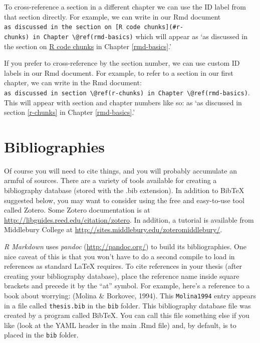 \documentclass[print]{nuthesis}
\begin{document}
To cross-reference a section in a different chapter we can use the ID label from that section directly. For example, we can write in our Rmd document \texttt{as\ discussed\ in\ the\ section\ on\ {[}R\ code\ chunks{]}(\#r-chunks)\ in\ Chapter\ \textbackslash{}@ref(rmd-basics)} which will appear as `as discussed in the section on \protect\hyperlink{r-chunks}{R code chunks} in Chapter \ref{rmd-basics}.'

If you prefer to cross-reference by the section number, we can use custom ID labels in our Rmd document. For example, to refer to a section in our first chapter, we can write in the Rmd document: \texttt{as\ discussed\ in\ section\ \textbackslash{}@ref(r-chunks)\ in\ Chapter\ \textbackslash{}@ref(rmd-basics)}. This will appear with section and chapter numbers like so: as `as discussed in section \ref{r-chunks} in Chapter \ref{rmd-basics}.'

\hypertarget{bibliographies}{%
\section{Bibliographies}\label{bibliographies}}

Of course you will need to cite things, and you will probably accumulate an armful of sources. There are a variety of tools available for creating a bibliography database (stored with the .bib extension). In addition to BibTeX suggested below, you may want to consider using the free and easy-to-use tool called Zotero. Some Zotero documentation is at \url{http://libguides.reed.edu/citation/zotero}. In addition, a tutorial is available from Middlebury College at \url{http://sites.middlebury.edu/zoteromiddlebury/}.

\emph{R Markdown} uses \emph{pandoc} (\url{http://pandoc.org/}) to build its bibliographies. One nice caveat of this is that you won't have to do a second compile to load in references as standard LaTeX requires. To cite references in your thesis (after creating your bibliography database), place the reference name inside square brackets and precede it by the ``at'' symbol. For example, here's a reference to a book about worrying: (Molina \& Borkovec, 1994). This \texttt{Molina1994} entry appears in a file called \texttt{thesis.bib} in the \texttt{bib} folder. This bibliography database file was created by a program called BibTeX. You can call this file something else if you like (look at the YAML header in the main .Rmd file) and, by default, is to placed in the \texttt{bib} folder.
\end{document}
